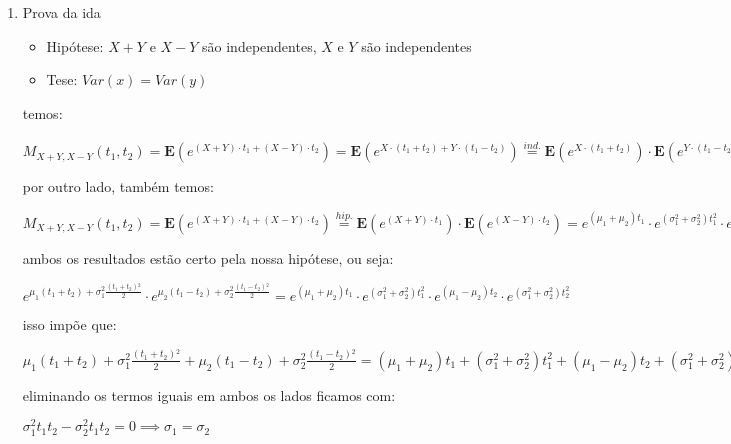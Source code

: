 \documentclass[english]{article}
\begin{document}
\begin{enumerate}
$e^{(\mu_{1}+\mu_{2})t_{1}}\cdot e^{\sigma^{2}t_{1}^{2}}\cdot e^{(\mu_{1-}\mu_{2})t_{2}}\cdot e^{\sigma^{2}t_{2}^{2}}=M_{X+Y}(t_{1})\cdot M_{X-Y}(t_{2})$


Ou seja, mostramos que $M_{X+Y,X-Y}(t_{1},t_{2})=M_{X+Y}(t_{1})\cdot M_{X-Y}(t_{2})\implies$$X+Y$
e $X-Y$ são independentes

\item Prova da ida

\begin{itemize}
\item Hipótese: $X+Y$ e $X-Y$ são independentes, $X$ e $Y$ são independentes
\item Tese: $Var(x)=Var(y)$
\end{itemize}

temos:


$M_{X+Y,X-Y}(t_{1},t_{2})=\mathbf{E}(e^{(X+Y)\cdot t_{1}+(X-Y)\cdot t_{2}})=\mathbf{E}(e^{X\cdot(t_{1}+t_{2})+Y\cdot(t_{1}-t_{2})})\overset{ind.}{=}\mathbf{E}(e^{X\cdot(t_{1}+t_{2})})\cdot\mathbf{E}(e^{Y\cdot(t_{1}-t_{2})})=e^{\mu_{1}(t_{1}+t_{2})+\sigma_{1}^{2}\frac{(t_{1}+t_{2}){}^{2}}{2}}\cdot e^{\mu_{2}(t_{1}-t_{2})+\sigma_{2}^{2}\frac{(t_{1}-t_{2}){}^{2}}{2}}$


por outro lado, também temos:


$M_{X+Y,X-Y}(t_{1},t_{2})=\mathbf{E}(e^{(X+Y)\cdot t_{1}+(X-Y)\cdot t_{2}})\overset{hip.}{=}\mathbf{E}(e^{(X+Y)\cdot t_{1}})\cdot\mathbf{E}(e^{(X-Y)\cdot t_{2}})=e^{(\mu_{1}+\mu_{2})t_{1}}\cdot e^{(\sigma_{1}^{2}+\sigma_{2}^{2})t_{1}^{2}}\cdot e^{(\mu_{1}-\mu_{2})t_{2}}\cdot e^{(\sigma_{1}^{2}+\sigma_{2}^{2})t_{2}^{2}}$


ambos os resultados estão certo pela nossa hipótese, ou seja:


$e^{\mu_{1}(t_{1}+t_{2})+\sigma_{1}^{2}\frac{(t_{1}+t_{2}){}^{2}}{2}}\cdot e^{\mu_{2}(t_{1}-t_{2})+\sigma_{2}^{2}\frac{(t_{1}-t_{2}){}^{2}}{2}}=e^{(\mu_{1}+\mu_{2})t_{1}}\cdot e^{(\sigma_{1}^{2}+\sigma_{2}^{2})t_{1}^{2}}\cdot e^{(\mu_{1}-\mu_{2})t_{2}}\cdot e^{(\sigma_{1}^{2}+\sigma_{2}^{2})t_{2}^{2}}$


isso impõe que:


$\mu_{1}(t_{1}+t_{2})+\sigma_{1}^{2}\frac{(t_{1}+t_{2}){}^{2}}{2}+\mu_{2}(t_{1}-t_{2})+\sigma_{2}^{2}\frac{(t_{1}-t_{2}){}^{2}}{2}=(\mu_{1}+\mu_{2})t_{1}+(\sigma_{1}^{2}+\sigma_{2}^{2})t_{1}^{2}+(\mu_{1}-\mu_{2})t_{2}+(\sigma_{1}^{2}+\sigma_{2}^{2})t_{2}^{2}$


eliminando os termos iguais em ambos os lados ficamos com:


$\sigma_{1}^{2}t_{1}t_{2}-\sigma_{2}^{2}t_{1}t_{2}=0\implies\sigma_{1}=\sigma_{2}$

\end{enumerate}
\end{document}
